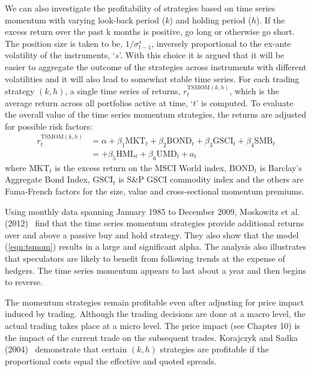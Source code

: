 We can also investigate the profitability of strategies based on time series momentum with varying look-back period ($k$) and holding period ($h$). If the excess return over the past k months is positive, go long or otherwise go short. The position size is taken to be, $1/\sigma_{t-1}^s$, inversely proportional to the ex-ante volatility of the instruments, `$s$'. With this choice it is argued that it will be easier to aggregate the outcome of the strategies across instruments with different volatilities and it will also lead to somewhat stable time series. For each trading strategy $(k,h)$, a single time series of returns, $r_t^{\text{TSMOM}(k,h)}$, which is the average return across all portfolios active at time, `$t$' is computed. To evaluate the overall value of the time series momentum strategies, the returns are adjusted for possible risk factors:
	\begin{equation}\label{eqn:tsmom}
	\begin{split}
	r_t^{\text{TSMOM}(k,h)}&= \alpha + \beta_1 \text{MKT}_t + \beta_2 \text{BOND}_t + \beta_3 \text{GSCI}_t + \beta_4 \text{SMB}_t \\
	&=  + \beta_5 \text{HML}_t + \beta_6 \text{UMD}_t + a_t 
	\end{split}
	\end{equation}
where $\text{MKT}_t$ is the excess return on the MSCI World index, $\text{BOND}_t$ is Barclay's Aggregate Bond Index, $\text{GSCI}_t$ is S\&P GSCI commodity index and the others are Fama-French factors for the size, value and cross-sectional momentum premiums.


Using monthly data spanning January 1985 to December 2009, Moskowitz et al. (2012)~\cite{mos2012} find that the time series momentum strategies provide additional returns over and above a passive buy and hold strategy. They also show that the model (\ref{eqn:tsmom}) results in a large and significant alpha. The analysis also illustrates that speculators are likely to benefit from following trends at the expense of hedgers. The time series momentum appears to last about a year and then begins to reverse.


The momentum strategies remain profitable even after adjusting for price impact induced by trading. Although the trading decisions are done at a macro level, the actual trading takes place at a micro level. The price impact (see Chapter 10) is the impact of the current trade on the subsequent trades. Korajczyk and Sadka (2004)~\cite{kora2004} demonstrate that certain $(k,h)$ strategies are profitable if the proportional costs equal the effective and quoted spreads.


